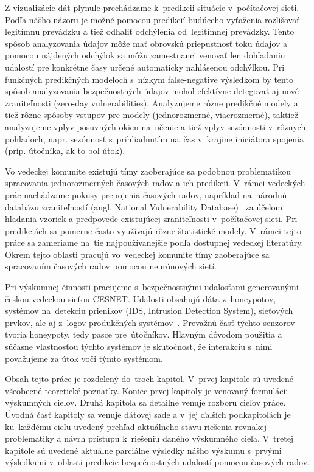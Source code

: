 \documentclass[thesismargins, thesislinespacing, openright, upjsfrontpage]{rnthesis}
\begin{document}
Z vizualizácie dát plynule prechádzame k~predikcii situácie v~počítačovej sieti. Podľa nášho názoru je možné pomocou predikcií budúceho vyťaženia rozlišovať legitímnu prevádzku a tiež odhaliť odchýlenia od~legitímnej prevádzky. Tento spôsob analyzovania údajov môže mať obrovskú priepustnosť toku údajov a pomocou nájdených odchýlok sa môžu zamestnanci venovať len dohľadaniu udalostí pre konkrétne časy určené automaticky nahlásenou odchýlkou. Pri funkčných predikčných modeloch s~nízkym false-negative výsledkom by tento spôsob analyzovania bezpečnostných údajov mohol efektívne detegovať aj nové zraniteľnosti (zero-day vulnerabilities). Analyzujeme rôzne predikčné modely a tiež rôzne spôsoby vstupov pre modely (jednorozmerné, viacrozmerné), taktiež analyzujeme vplyv posuvných okien na~učenie a tiež vplyv sezónnosti v~rôznych pohľadoch, napr. sezónnosť s~prihliadnutím na~čas v~krajine iniciátora spojenia (príp. útočníka, ak to bol útok).

Vo vedeckej komunite existujú tímy zaoberajúce sa podobnou problematikou spracovania jednorozmerných časových radov a ich predikcií. V~rámci vedeckých prác nachádzame pokusy prepojenia časových radov, napríklad na~národnú databázu zraniteľností (angl. National Vulnerability Database)~\cite{roumani2015time} za účelom hľadania vzoriek a predpovede existujúcej zraniteľnosti v~počítačovej sieti. Pri predikciách sa pomerne často využívajú rôzne štatistické modely. V~rámci tejto práce sa zameriame na~tie najpoužívanejšie podľa dostupnej vedeckej literatúry. Okrem tejto oblasti pracujú vo~vedeckej komunite tímy zaoberajúce sa spracovaním časových radov pomocou neurónových sietí.

Pri výskumnej činnosti pracujeme s~bezpečnostnými udalosťami generovanými českou vedeckou sieťou CESNET. Udalosti obsahujú dáta z~honeypotov, systémov na~detekciu prienikov (IDS, Intrusion Detection System), sieťových prvkov, ale aj z~logov produkčných systémov~\cite{kacha2015warden}. Prevažnú časť týchto senzorov tvoria honeypoty, tedy pasce pre~útočníkov. Hlavným dôvodom použitia a súčasne vlastnosťou týchto systémov je skutočnosť, že interakciu s~nimi považujeme za útok voči týmto systémom.

Obsah tejto práce je rozdelený do~troch kapitol. V~prvej kapitole sú uvedené všeobecné teoretické poznatky. Koniec prvej kapitoly je venovaný formulácii výskumných cieľov. Druhá kapitola sa detailne venuje rozboru cieľov práce. Úvodná časť kapitoly sa venuje dátovej sade a v~jej ďalších podkapitolách je ku~každému cieľu uvedený prehľad aktuálneho stavu riešenia rovnakej problematiky a návrh prístupu k~riešeniu daného výskumného cieľa. V~tretej kapitole sú uvedené aktuálne parciálne výsledky nášho výskumu s~prvými výsledkami v~oblasti predikcie bezpečnostných udalostí pomocou časových radov.
\end{document}
